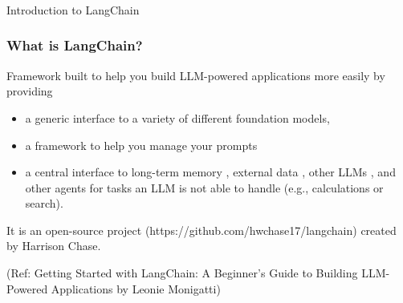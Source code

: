 \begin{frame}[fragile]\frametitle{}
\begin{center}
{\Large Introduction to LangChain}
\end{center}
\end{frame}




\begin{frame}[fragile]\frametitle{What is LangChain?}

Framework built to help you build LLM-powered applications more easily by providing 

\begin{itemize}
\item a generic interface to a variety of different foundation models,
\item a framework to help you manage your prompts 
\item a central interface to long-term memory , external data , other LLMs , and other agents for tasks an LLM is not able to handle (e.g., calculations or search).
\end{itemize}

It is an open-source project (https://github.com/hwchase17/langchain) created by Harrison Chase.

{\tiny (Ref: Getting Started with LangChain: A Beginner’s Guide to Building LLM-Powered Applications by Leonie Monigatti)}
\end{frame}



